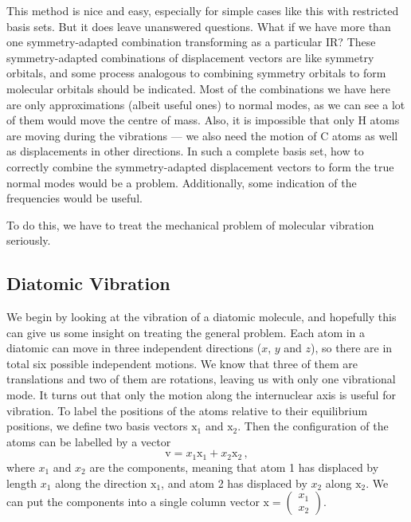 \documentclass{article}
\theoremstyle{plain}\theoremheaderfont{\normalfont\itshape}\theorembodyfont{\rmfamily}\theoremseparator{.}\newtheorem*{rem}{Remark}\newtheorem*{ex}{Example}\newtheorem*{proof}{Proof}\newtheorem*{altp}{Alternative proof}
\theoremstyle{plain}\theoremheaderfont{\normalfont\bfseries}\theorembodyfont{\rmfamily}\theoremseparator{.}\newtheorem{thm}{Theorem}[section]\newtheorem{lem}[thm]{Lemma}\newtheorem{prop}[thm]{Proposition}\newtheorem*{cor}{Corollary}\newtheorem{defn}[thm]{Definition}\newtheorem{clm}[thm]{Claim}\newtheorem{clminproof}{Claim}
\theoremstyle{break}\theoremheaderfont{\normalfont\itshape}\theorembodyfont{\rmfamily}\theoremseparator{.\medskip}\newtheorem*{proofskip}{Proof}\newtheorem*{exs}{Examples}\newtheorem*{rems}{Remarks}
\theoremstyle{break}\theoremheaderfont{\normalfont\bfseries}\theorembodyfont{\rmfamily}\theoremseparator{.\medskip}\newtheorem{lemskip}[thm]{Lemma}\newtheorem{defnskip}[thm]{Definition}\newtheorem{propskip}[thm]{Proposition}\newtheorem{thmskip}[thm]{Theorem}
\numberwithin{equation}{section}
\newcommand{\vb}[1]{\bm{\mathrm{#1}}}
\begin{document}
    This method is nice and easy, especially for simple cases like this with restricted basis sets. But it does leave unanswered questions. What if we have more than one symmetry-adapted combination transforming as a particular IR? These symmetry-adapted combinations of displacement vectors are like symmetry orbitals, and some process analogous to combining symmetry orbitals to form molecular orbitals should be indicated. Most of the combinations we have here are only approximations (albeit useful ones) to normal modes, as we can see a lot of them would move the centre of mass. Also, it is impossible that only \(\mathrm{H}\) atoms are moving during the vibrations --- we also need the motion of \(\mathrm{C}\) atoms as well as displacements in other directions. In such a complete basis set, how to correctly combine the symmetry-adapted displacement vectors to form the true normal modes would be a problem. Additionally, some indication of the frequencies would be useful.

    To do this, we have to treat the mechanical problem of molecular vibration seriously.

    \subsection{Diatomic Vibration}
    We begin by looking at the vibration of a diatomic molecule, and hopefully this can give us some insight on treating the general problem. Each atom in a diatomic can move in three independent directions (\(x\), \(y\) and \(z\)), so there are in total six possible independent motions. We know that three of them are translations and two of them are rotations, leaving us with only one vibrational mode. It turns out that only the motion along the internuclear axis is useful for vibration. To label the positions of the atoms relative to their equilibrium positions, we define two basis vectors \(\vb{x}_1\) and \(\vb{x}_2\). Then the configuration of the atoms can be labelled by a vector
    \begin{equation}
        \vb{v}=x_1\vb{x}_1+x_2\vb{x}_2\,,
    \end{equation}
    where \(x_1\) and \(x_2\) are the components, meaning that atom 1 has displaced by length \(x_1\) along the direction \(\vb{x}_1\), and atom 2 has displaced by \(x_2\) along \(\vb{x}_2\). We can put the components into a single column vector \(\vb{x}=\begin{pmatrix}
        x_1 \\ x_2
    \end{pmatrix}\).
\end{document}
